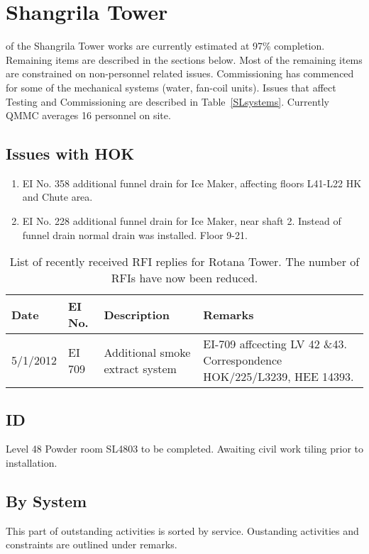\chapter{Shangrila Tower}

 of the Shangrila Tower works are currently estimated at 97\% completion. Remaining items are described in the sections below.  Most of the remaining items  are constrained on non-personnel related issues. Commissioning has commenced for some of the mechanical systems (water, fan-coil units). Issues that affect Testing and Commissioning are described in Table~\ref{SLsystems}. Currently QMMC averages 16 personnel on site. 

\section{Issues with HOK}

\begin{enumerate}
\item EI No. 358 additional funnel drain for Ice Maker, affecting floors L41-L22 HK and Chute area.
\item EI No. 228 additional funnel drain for Ice Maker, near shaft 2. Instead of funnel drain normal drain was installed. Floor 9-21.
\end{enumerate}


\begin{table}[htbp]
\small\RaggedRight
\begin{tabular}{@{}llp{3cm}p{3cm}}
\toprule
Date &EI No. &Description &Remarks\\
\midrule
5/1/2012 &EI 709  &Additional smoke extract system &EI-709 affcecting LV 42 \&43. Correspondence HOK/225/L3239, HEE 14393.\\
\bottomrule
\end{tabular}
\caption{List of recently received RFI replies for Rotana Tower. The number of RFIs have now been reduced.}
\end{table}
\section{ID}
Level 48 Powder room SL4803 to be completed. Awaiting civil work tiling prior to installation.



\section{By System}
This part of outstanding activities is sorted by service. Oustanding activities and constraints are outlined under remarks. 
\bigskip

